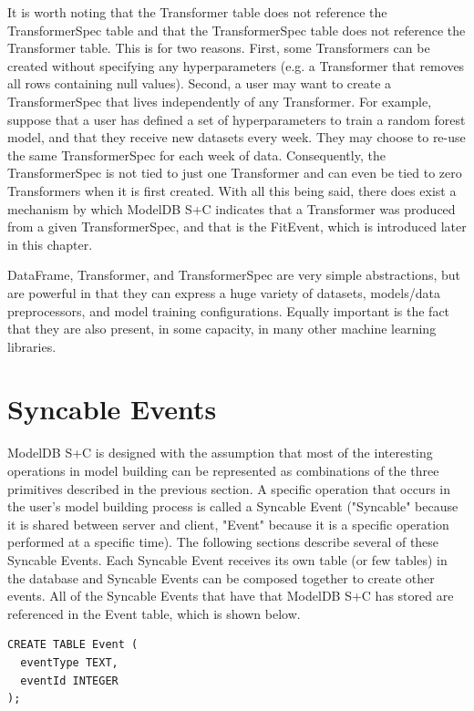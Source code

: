 It is worth noting that the Transformer table does not reference the TransformerSpec
table and that the TransformerSpec table does not reference the Transformer table. This
is for two reasons. First, some Transformers can be created without specifying any
hyperparameters (e.g. a Transformer that removes all rows containing null values). 
Second, a user may want to create a TransformerSpec that lives independently of any
Transformer. For example, suppose that a user has defined a set of hyperparameters to
train a random forest model, and that they receive new datasets every week. They may choose
to re-use the same TransformerSpec for each week of data. Consequently, the TransformerSpec is
not tied to just one Transformer and can even be tied to zero Transformers when it is first created. With
all this being said, there does exist a mechanism by which ModelDB S+C indicates that a Transformer
was produced from a given TransformerSpec, and that is the FitEvent, which is introduced later in
this chapter.

DataFrame, Transformer, and TransformerSpec are very simple abstractions, but are powerful in that
they can express a huge variety of datasets, models/data preprocessors, and model training configurations.
Equally important is the fact that they are also present, in some capacity, in many other machine learning
libraries.

\section{Syncable Events}
ModelDB S+C is designed with the assumption that most of the interesting operations in
model building can be represented as combinations of the three primitives described in the
previous section. A specific operation that occurs in the user's model building process
is called a Syncable Event ("Syncable" because it is shared between server and client, 
"Event" because it is a specific operation performed at a specific time). The following
sections describe several of these Syncable Events. Each Syncable Event receives its own
table (or few tables) in the database and Syncable Events can be composed together to
create other events. All of the Syncable Events that have that ModelDB S+C has stored
are referenced in the Event table, which is shown below.

\begin{verbatim}
CREATE TABLE Event (
  eventType TEXT,
  eventId INTEGER
);
\end{verbatim}

